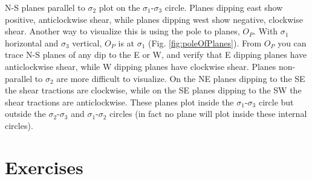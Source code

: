 \documentclass[a4paper , 12pt]{book}
\begin{document}
N-S planes parallel to $\sigma_2$ plot on the $\sigma_1$-$\sigma_3$ circle. Planes dipping east show positive, anticlockwise shear, while planes dipping west show negative, clockwise shear. Another way to visualize this is using the pole to planes, $O_P$. With $\sigma_1$ horizontal and $\sigma_3$ vertical, $O_P$ is at $\sigma_1$ (Fig. \ref{fig:poleOfPlanes}). From $O_P$ you can trace N-S planes of any dip to the E or W, and verify that E dipping planes have anticlockwise shear, while W dipping planes have clockwise shear. Planes non-parallel to $\sigma_2$ are more difficult to visualize. On the NE planes dipping to the SE the shear tractions are clockwise, while on the SE planes dipping to the SW the shear tractions are anticlockwise. These planes plot inside the $\sigma_1$-$\sigma_3$ circle but outside the $\sigma_2$-$\sigma_3$ and $\sigma_1$-$\sigma_2$ circles (in fact no plane will plot inside these internal circles). 

\section{Exercises}
\end{document}
